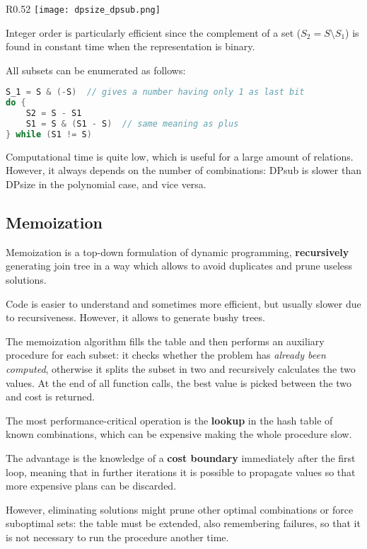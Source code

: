 \begin{wrapfigure}{R}{0.52\textwidth}
	\vspace{-27pt}
	\texttt{[image: dpsize\_dpsub.png]}
	\vspace{-100pt}
\end{wrapfigure}

Integer order is particularly efficient since the complement of a set ($S_2 = S \setminus S_1$) is found in constant time when the representation is binary.

All subsets can be enumerated as follows:
\begin{lstlisting}[language=C++]	S_1 = S & (-S)  // gives a number having only 1 as last bit
do {
	S2 = S - S1
	S1 = S & (S1 - S)  // same meaning as plus
} while (S1 != S)
\end{lstlisting}

Computational time is quite low, which is useful for a large amount of relations. However, it always depends on the number of combinations: DPsub is slower than DPsize in the polynomial case, and vice versa.

\subsection{Memoization}
Memoization is a top-down formulation of dynamic programming, \textbf{recursively} generating join tree in a way which allows to avoid duplicates and prune useless solutions.

Code is easier to understand and sometimes more efficient, but usually slower due to recursiveness. However, it allows to generate bushy trees.

The memoization algorithm fills the table and then performs an auxiliary procedure for each subset: it checks whether the problem has \textit{already been computed}, otherwise it splits the subset in two and recursively calculates the two values. At the end of all function calls, the best value is picked between the two and cost is returned. 

The most performance-critical operation is the \textbf{lookup} in the hash table of known combinations, which can be expensive making the whole procedure slow.

The advantage is the knowledge of a \textbf{cost boundary} immediately after the first loop, meaning that in further iterations it is possible to propagate values so that more expensive plans can be discarded.

However, eliminating solutions might prune other optimal combinations or force suboptimal sets: the table must be extended, also remembering failures, so that it is not necessary to run the procedure another time.

